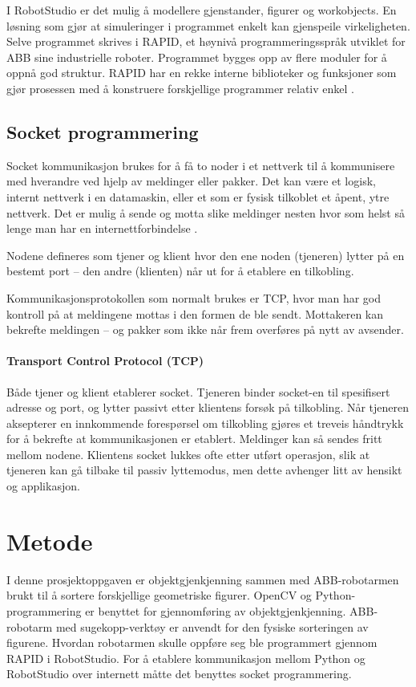 \documentclass[conference]{IEEEtran}
\begin{document}
        I RobotStudio er det mulig å modellere gjenstander, figurer og workobjects. En løsning som gjør at simuleringer i programmet enkelt kan 
        gjenspeile virkeligheten. Selve programmet skrives i RAPID, et høynivå programmeringsspråk utviklet for ABB sine industrielle roboter. 
        Programmet bygges opp av flere moduler for å oppnå god struktur. RAPID har en rekke interne biblioteker og funksjoner som gjør prosessen 
        med å konstruere forskjellige programmer relativ enkel \cite{teori:RobStud} \cite{teori:RobStud1}. 

    \subsection{Socket programmering}
        Socket kommunikasjon brukes for å få to noder i et nettverk til å kommunisere med hverandre ved hjelp av meldinger eller pakker. Det kan 
        være et logisk, internt nettverk i en datamaskin, eller et som er fysisk tilkoblet et åpent, ytre nettverk. Det er mulig å sende og motta 
        slike meldinger nesten hvor som helst så lenge man har en internettforbindelse \cite{teori:socket}.

        Nodene defineres som tjener og klient hvor den ene noden (tjeneren) lytter på en bestemt port – den andre (klienten) når ut for å etablere 
        en tilkobling.

        Kommunikasjonsprotokollen som normalt brukes er TCP, hvor man har god kontroll på at meldingene mottas i den formen de ble sendt. Mottakeren 
        kan bekrefte meldingen – og pakker som ikke når frem overføres på nytt av avsender.
        \paragraph{Transport Control Protocol (TCP)}
            Både tjener og klient etablerer socket. Tjeneren binder socket-en til spesifisert adresse og port, og lytter passivt etter klientens 
            forsøk på tilkobling. Når tjeneren aksepterer en innkommende forespørsel om tilkobling gjøres et treveis håndtrykk for å bekrefte at 
            kommunikasjonen er etablert. Meldinger kan så sendes fritt mellom nodene. Klientens socket lukkes ofte etter utført operasjon, slik at 
            tjeneren kan gå tilbake til passiv lyttemodus, men dette avhenger litt av hensikt og applikasjon.
    
\section{Metode}
    I denne prosjektoppgaven er objektgjenkjenning sammen med ABB-robotarmen brukt til å sortere forskjellige geometriske figurer. OpenCV og 
    Python-programmering er benyttet for gjennomføring av objektgjenkjenning. ABB-robotarm med sugekopp-verktøy er anvendt for den fysiske 
    sorteringen av figurene. Hvordan robotarmen skulle oppføre seg ble programmert gjennom RAPID i RobotStudio. For å etablere kommunikasjon 
    mellom Python og RobotStudio over internett måtte det benyttes socket programmering.
\end{document}
